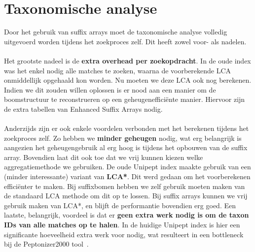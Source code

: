 \section{Taxonomische analyse}\label{sec:taxonomische-analyse}
Door het gebruik van suffix arrays moet de taxonomische analyse volledig uitgevoerd worden tijdens het zoekproces zelf.
Dit heeft zowel voor- als nadelen.
\\ \\
Het grootste nadeel is de \textbf{extra overhead per zoekopdracht}.
In de oude index was het enkel nodig alle matches te zoeken, waarna de voorberekende LCA onmiddellijk opgehaald kon worden.
Nu moeten we deze LCA ook nog berekenen.
Indien we dit zouden willen oplossen is er nood aan een manier om de boomstructuur te reconstrueren op een geheugenefficiënte manier.
Hiervoor zijn de extra tabellen van Enhanced Suffix Arrays nodig.
\\ \\
Anderzijds zijn er ook enkele voordelen verbonden met het berekenen tijdens het zoekproces zelf.
Zo hebben we \textbf{minder geheugen} nodig, wat erg belangrijk is aangezien het geheugengebruik al erg hoog is tijdens het opbouwen van de suffix array.
Bovendien laat dit ook toe dat we vrij kunnen kiezen welke aggregatiemethode we gebruiken.
De oude Unipept index maakte gebruik van een (minder interessante) variant van \textbf{LCA*}.
Dit werd gedaan om het voorberekenen efficiënter te maken.
Bij suffixbomen hebben we zelf gebruik moeten maken van de standaard LCA methode om dit op te lossen.
Bij suffix arrays kunnen we vrij gebruik maken van LCA*, en blijft de performantie bovendien erg goed.
Een laatste, belangrijk, voordeel is dat er \textbf{geen extra werk nodig is om de taxon IDs van alle matches op te halen}.
In de huidige Unipept index is hier een significante hoeveelheid extra werk voor nodig, wat resulteert in een bottleneck bij de Peptonizer2000 tool~\cite{pep_gm}.



